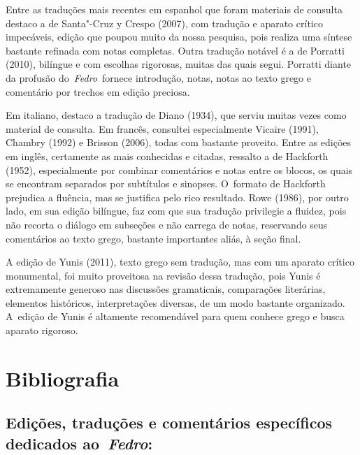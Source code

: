 Entre as traduções mais recentes em espanhol que foram materiais de
consulta destaco a de Santa"-Cruz y Crespo (2007), com tradução e aparato
crítico impecáveis, edição que poupou muito da nossa pesquisa, pois
realiza uma síntese bastante refinada com notas completas. Outra
tradução notável é a de Porratti (2010), bilíngue e com escolhas
rigorosas, muitas das quais segui. Porratti diante da profusão
do~\emph{Fedro}~fornece introdução, notas, notas ao texto grego e
comentário por trechos em edição preciosa.

Em italiano, destaco a tradução de Diano (1934), que serviu muitas vezes
como material de consulta. Em francês, consultei especialmente Vicaire
(1991), Chambry (1992) e Brisson (2006), todas com bastante proveito.
Entre as edições em inglês, certamente as mais conhecidas e citadas,
ressalto a de Hackforth (1952), especialmente por combinar comentários e
notas entre os blocos, os quais se encontram separados por subtítulos e
sinopses. O~formato de Hackforth prejudica a fluência, mas se justifica
pelo rico resultado. Rowe (1986), por outro lado, em sua edição bilíngue,
faz com que sua tradução privilegie a fluidez, pois não recorta o
diálogo em subseções e não carrega de notas, reservando seus comentários
ao texto grego, bastante importantes aliás, à seção final.

A edição de Yunis (2011), texto grego sem tradução, mas com um aparato
crítico monumental, foi muito proveitosa na revisão dessa tradução, pois
Yunis é extremamente generoso nas discussões gramaticais, comparações
literárias, elementos históricos, interpretações diversas, de um modo
bastante organizado. A~edição de Yunis é altamente recomendável para
quem conhece grego e busca aparato rigoroso.

 

\section{Bibliografia}

\subsection{Edições, traduções e comentários específicos dedicados
ao~\emph{Fedro}:}

 

